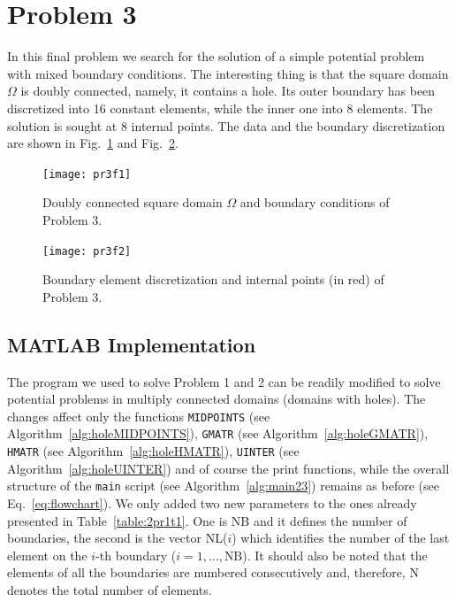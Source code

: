
\section{Problem 3}
\label{sec:problem_3}%

In this final problem we search for the solution of a simple potential problem with mixed boundary conditions. The interesting thing is that the square domain $\Omega$ is doubly connected, namely, it contains a hole. Its outer boundary has been discretized into 16 constant elements, while the inner one into 8 elements. The solution is sought at 8 internal points. The data and the boundary discretization are shown in Fig.~\ref{fig:2pr3f1} and Fig.~\ref{fig:2pr3f2}.

\begin{figure}[H]
    \centering
    \texttt{[image: pr3f1]}
    \caption{Doubly connected square domain $\Omega$ and boundary conditions of Problem 3.}
    \label{fig:2pr3f1}
\end{figure}

\begin{figure}[H]
    \centering
    \texttt{[image: pr3f2]}
    \caption{Boundary element discretization and internal points (in red) of Problem 3.}
    \label{fig:2pr3f2}
\end{figure}

\subsection{MATLAB Implementation}
\label{sub:MATLAB_implementation4}%

The program we used to solve Problem 1 and 2 can be readily modified to solve potential problems in multiply connected domains (domains with holes). The changes affect only the functions \texttt{MIDPOINTS} (see Algorithm~\ref{alg:holeMIDPOINTS}), \texttt{GMATR} (see Algorithm~\ref{alg:holeGMATR}), \texttt{HMATR} (see Algorithm~\ref{alg:holeHMATR}), \texttt{UINTER} (see Algorithm~\ref{alg:holeUINTER}) and of course the print functions, while the overall structure of the \texttt{main} script (see Algorithm~\ref{alg:main23}) remains as before (see Eq.~\eqref{eq:flowchart}). We only added two new parameters to the ones already presented in Table~\ref{table:2pr1t1}. One is NB and it defines the number of boundaries, the second is the vector NL($i$) which identifies the number of the last element on the $i$-th boundary ($i=1,\dots,\text{NB}$). It should also be noted that the elements of all the boundaries are numbered consecutively and, therefore, N denotes the total number of elements.

